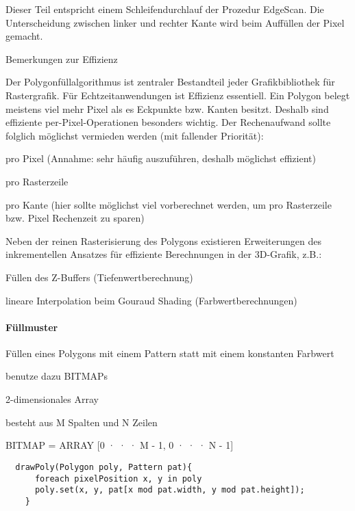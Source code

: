 \documentclass[landscape]{article}
\begin{document}
\begin{multicols}{3}
\begin{itemize*}
\begin{itemize*}
            \item  Dieser Teil entspricht einem Schleifendurchlauf der Prozedur EdgeScan. Die Unterscheidung zwischen linker und rechter Kante wird beim Auffüllen der Pixel gemacht.
          \end{itemize*}
    \item Bemerkungen zur Effizienz
    \item \begin{itemize*}
            \item Der Polygonfüllalgorithmus ist zentraler Bestandteil jeder Grafikbibliothek für Rastergrafik. Für Echtzeitanwendungen ist Effizienz essentiell. Ein Polygon belegt
                  meistens viel mehr Pixel als es Eckpunkte bzw. Kanten besitzt. Deshalb sind effiziente per-Pixel-Operationen besonders wichtig. Der Rechenaufwand sollte folglich möglichst vermieden werden (mit fallender Priorität):
            \item  pro Pixel (Annahme: sehr häufig auszuführen, deshalb möglichst effizient)
            \item  pro Rasterzeile
            \item  pro Kante (hier sollte möglichst viel vorberechnet werden, um pro Rasterzeile bzw. Pixel Rechenzeit zu sparen)
            \item Neben der reinen Rasterisierung des Polygons existieren Erweiterungen des inkrementellen Ansatzes für effiziente Berechnungen in der 3D-Grafik, z.B.:
            \item Füllen des Z-Buffers (Tiefenwertberechnung)
            \item lineare Interpolation beim Gouraud Shading (Farbwertberechnungen)
          \end{itemize*}
  \end{itemize*}
  
  \paragraph{Füllmuster}
  \begin{itemize*}
    \item Füllen eines Polygons mit einem Pattern statt mit einem konstanten Farbwert
    \item benutze dazu BITMAPs
    \item 2-dimensionales Array
    \item besteht aus M Spalten und N Zeilen
    \item BITMAP = ARRAY [0 · · · M - 1, 0 · · · N - 1]
  \end{itemize*}
  \begin{lstlisting}
  drawPoly(Polygon poly, Pattern pat){
      foreach pixelPosition x, y in poly
      poly.set(x, y, pat[x mod pat.width, y mod pat.height]);
    }
  \end{lstlisting}
  

\end{multicols}
\end{document}
